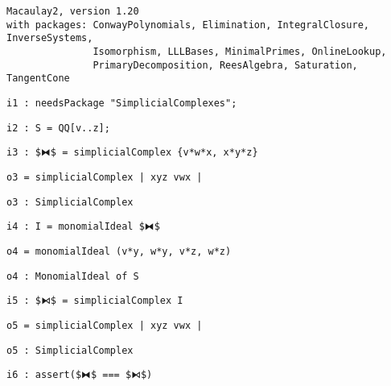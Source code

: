 \documentclass[12pt,leqno]{amsart}
\theoremstyle{definition}
\begin{document}
\begin{lstlisting}[xleftmargin=10pt, lineskip=-5pt, aboveskip=5.0pt, belowskip=1.5pt]
Macaulay2, version 1.20
with packages: ConwayPolynomials, Elimination, IntegralClosure, InverseSystems,
               Isomorphism, LLLBases, MinimalPrimes, OnlineLookup,
               PrimaryDecomposition, ReesAlgebra, Saturation, TangentCone
\end{lstlisting}
\begin{lstlisting}[xleftmargin=10pt, aboveskip=1.5pt, belowskip=1.5pt]
i1 : needsPackage "SimplicialComplexes";
\end{lstlisting}
\begin{lstlisting}[xleftmargin=10pt, aboveskip=1.5pt, belowskip=1.5pt]
i2 : S = QQ[v..z];
\end{lstlisting}
\begin{lstlisting}[xleftmargin=10pt, aboveskip=1.5pt, belowskip=1.5pt]
i3 : $⧓$ = simplicialComplex {v*w*x, x*y*z}
\end{lstlisting}
\begin{lstlisting}[xleftmargin=10pt, aboveskip=1.5pt, belowskip=1.5pt]
o3 = simplicialComplex | xyz vwx |
\end{lstlisting}
\begin{lstlisting}[xleftmargin=10pt, aboveskip=1.5pt, belowskip=1.5pt]
o3 : SimplicialComplex
\end{lstlisting}
\begin{lstlisting}[xleftmargin=10pt, aboveskip=1.5pt, belowskip=1.5pt]
i4 : I = monomialIdeal $⧓$
\end{lstlisting}
\begin{lstlisting}[xleftmargin=10pt, lineskip=-10pt, aboveskip=4pt, belowskip=1.5pt]
o4 = monomialIdeal (v*y, w*y, v*z, w*z)
\end{lstlisting}
\begin{lstlisting}[xleftmargin=10pt, aboveskip=1.5pt, belowskip=1.5pt]
o4 : MonomialIdeal of S
\end{lstlisting}
\begin{lstlisting}[xleftmargin=10pt, aboveskip=1.5pt, belowskip=1.5pt]
i5 : $⧑$ = simplicialComplex I
\end{lstlisting}
\begin{lstlisting}[xleftmargin=10pt, aboveskip=1.5pt, belowskip=1.5pt]
o5 = simplicialComplex | xyz vwx |
\end{lstlisting}
\begin{lstlisting}[xleftmargin=10pt, aboveskip=1.5pt, belowskip=1.5pt]
o5 : SimplicialComplex
\end{lstlisting}
\begin{lstlisting}[xleftmargin=10pt, aboveskip=1.5pt, belowskip=3.0pt]
i6 : assert($⧓$ === $⧑$)
\end{lstlisting}
\end{document}
